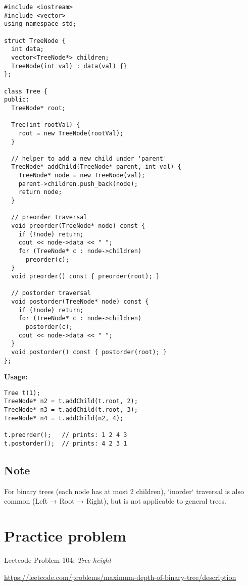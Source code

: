 \documentclass{article}
\begin{document}
\begin{lstlisting}[style=cppstyle]
#include <iostream>
#include <vector>
using namespace std;

struct TreeNode {
  int data;
  vector<TreeNode*> children;
  TreeNode(int val) : data(val) {}
};

class Tree {
public:
  TreeNode* root;

  Tree(int rootVal) {
    root = new TreeNode(rootVal);
  }

  // helper to add a new child under 'parent'
  TreeNode* addChild(TreeNode* parent, int val) {
    TreeNode* node = new TreeNode(val);
    parent->children.push_back(node);
    return node;
  }

  // preorder traversal
  void preorder(TreeNode* node) const {
    if (!node) return;
    cout << node->data << " ";
    for (TreeNode* c : node->children)
      preorder(c);
  }
  void preorder() const { preorder(root); }

  // postorder traversal
  void postorder(TreeNode* node) const {
    if (!node) return;
    for (TreeNode* c : node->children)
      postorder(c);
    cout << node->data << " ";
  }
  void postorder() const { postorder(root); }
};
\end{lstlisting}

\textbf{Usage:}
\begin{lstlisting}[style=cppstyle]
Tree t(1);
TreeNode* n2 = t.addChild(t.root, 2);
TreeNode* n3 = t.addChild(t.root, 3);
TreeNode* n4 = t.addChild(n2, 4);

t.preorder();   // prints: 1 2 4 3
t.postorder();  // prints: 4 2 3 1
\end{lstlisting}




\subsection*{Note}
For binary trees (each node has at most 2 children), `inorder` traversal is also common (Left → Root → Right), but is not applicable to general trees.

\section{Practice problem}
Leetcode Problem 104: \textit{Tree height}

\url{https://leetcode.com/problems/maximum-depth-of-binary-tree/description}
\end{document}
